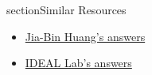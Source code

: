 \documentclass{article}
\begin{document}
section{Similar Resources}

\begin{itemize}
    \item \href{https://jbhuang0604.github.io/advisor_guide.html}{Jia-Bin Huang's answers}
    \item \href{https://ideal.umd.edu/blog/Prospective-Students-FAQ}{IDEAL Lab's answers}
\end{itemize}
























\end{document}
